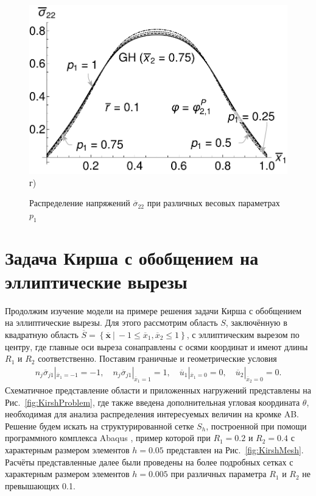 \begin{figure}[ht]
\begin{minipage}[b][][b]{0.49\linewidth}
        \includegraphics[width=\linewidth]{pics/TStressGH.pdf} \\ г)
    \end{minipage}
    \caption{Распределение напряжений $\overline{\sigma}_{22}$ при различных весовых параметрах $p_1$}
    \label{fig:TSigma}
\end{figure}

\section{Задача Кирша с обобщением на эллиптические вырезы}\label{sec:ResultsAnalysis/KirshProblem}

Продолжим изучение модели на примере решения задачи Кирша с обобщением на эллиптические вырезы. Для этого рассмотрим область $S$, заключённую в квадратную область $\overline{S} = \left\{ \boldsymbol{\overline{x}} \ | \ -1 \leqslant \overline{x}_1, \overline{x}_2 \leqslant 1 \right\}$, с эллиптическим вырезом по центру, где главные оси выреза сонаправлены с осями координат и имеют длины $R_1$ и $R_2$ соответственно. Поставим граничные и геометрические условия
\begin{gather*}
	n_j \overline{\sigma}_{j1} |_{\overline{x}_1 = -1} = -1,
	\quad
	n_j \overline{\sigma}_{j1} |_{\overline{x}_1 = 1} = 1,
	\quad
	\overline{u}_1 |_{\overline{x}_1 = 0} = 0,
	\quad
	\overline{u}_2 |_{\overline{x}_2 = 0} = 0.
\end{gather*}
Схематичное представление области и приложенных нагружений представлены на Рис.~\ref{fig:KirshProblem}, где также введена дополнительная угловая координата $\theta$, необходимая для анализа распределения интересуемых величин на кромке AB. Решение будем искать на структурированной сетке $S_h$, построенной при помощи программного комплекса Abaqus \cite{Abaqus}, пример которой при $R_1 = 0.2$ и $R_2 = 0.4$ с характерным размером элементов $h = 0.05$ представлен на Рис.~\ref{fig:KirshMesh}. Расчёты представленные далее были проведены на более подробных сетках с характерным размером элементов $h = 0.005$ при различных параметра $R_1$ и $R_2$ не превышающих 0.1.

